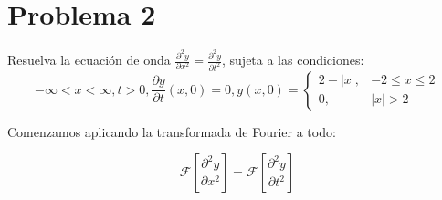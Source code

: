 \section{Problema 2} Resuelva la ecuación de onda $\frac{\partial^{2} y}{\partial x^{2}}=\frac{\partial^{2} y}{\partial t^{2}}$, sujeta a las condiciones:
$$
-\infty<x<\infty, t>0, \frac{\partial y}{\partial t}(x, 0)=0, y(x, 0)=\left\{\begin{array}{lr}
2-|x|, & -2 \leq x \leq 2 \\
0, & |x|>2
\end{array}\right.
$$

\begin{solution}
Comenzamos aplicando la transformada de Fourier a todo:

$$\mathcal{F}\left[\frac{\partial^{2} y}{\partial x^{2}}\right]=\mathcal{F}\left[\frac{\partial^{2} y}{\partial t^{2}}\right]$$
\end{solution}